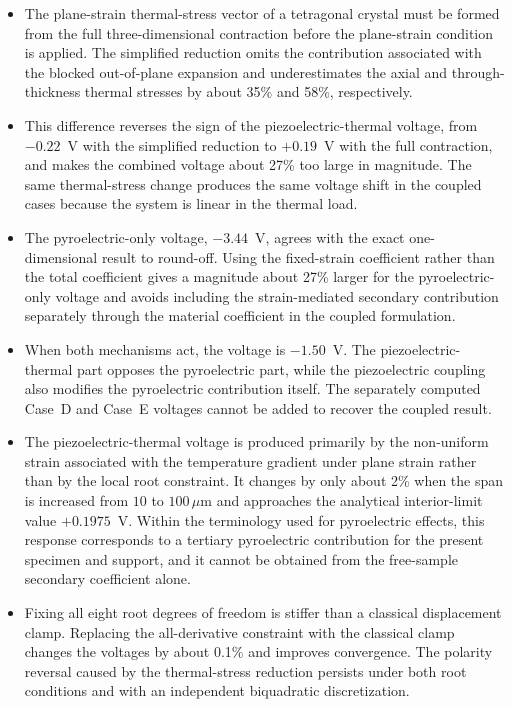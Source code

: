 \documentclass[a4paper,12pt]{elsarticle}
\begin{document}
\begin{itemize}
\item The plane-strain thermal-stress vector of a tetragonal crystal must be formed
from the full three-dimensional contraction before the plane-strain condition is
applied. The simplified reduction omits the contribution associated with the blocked
out-of-plane expansion and underestimates the axial and through-thickness thermal
stresses by about 35\% and 58\%, respectively.

\item This difference reverses the sign of the piezoelectric-thermal voltage, from
$-0.22$~V with the simplified reduction to $+0.19$~V with the full contraction, and
makes the combined voltage about 27\% too large in magnitude. The same thermal-stress
change produces the same voltage shift in the coupled cases because the system is
linear in the thermal load.

\item The pyroelectric-only voltage, $-3.44$~V, agrees with the exact one-dimensional
result to round-off. Using the fixed-strain coefficient rather than the total
coefficient gives a magnitude about 27\% larger for the pyroelectric-only voltage and
avoids including the strain-mediated secondary contribution separately through the
material coefficient in the coupled formulation.

\item When both mechanisms act, the voltage is $-1.50$~V. The piezoelectric-thermal
part opposes the pyroelectric part, while the piezoelectric coupling also modifies the
pyroelectric contribution itself. The separately computed Case~D and Case~E voltages cannot be added
to recover the coupled result.

\item The piezoelectric-thermal voltage is produced primarily by the non-uniform strain
associated with the temperature gradient under plane strain rather than by the local
root constraint. It changes by only about 2\% when the span is increased from
$10$ to $100\,\mu\text{m}$ and approaches the analytical interior-limit value $+0.1975$~V. Within the terminology used for pyroelectric effects, this
response corresponds to a tertiary pyroelectric contribution for the present specimen
and support, and it cannot be obtained from the free-sample secondary coefficient
alone.

\item Fixing all eight root degrees of freedom is stiffer than a classical displacement clamp.
Replacing the all-derivative constraint with the classical clamp changes the voltages
by about 0.1\% and improves convergence. The polarity reversal caused by the
thermal-stress reduction persists under both root conditions
and with an independent biquadratic discretization.


\end{itemize}
\end{document}
